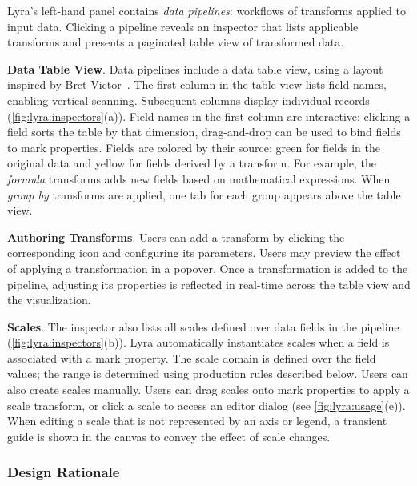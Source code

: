 \vspace{-7pt}

Lyra's left-hand panel contains \emph{data pipelines}: workflows of transforms
applied to input data. Clicking a pipeline reveals an inspector that lists
applicable transforms and presents a paginated table view of transformed data.

\textbf{Data Table View}. Data pipelines include a data table view, using a
layout inspired by Bret Victor~\cite{victor:drawing}. The first column in the
table view lists field names, enabling vertical scanning. Subsequent columns
display individual records (\cref{fig:lyra:inspectors}(a)). Field names in the
first column are interactive: clicking a field sorts the table by that
dimension, drag-and-drop can be used to bind fields to mark properties. Fields
are colored by their source: green for fields in the original data and yellow
for fields derived by a transform. For example, the \emph{formula} transforms
adds new fields based on mathematical expressions. When \emph{group by}
transforms are applied, one tab for each group appears above the table view.

\textbf{Authoring Transforms}. Users can add a transform by clicking the
corresponding icon and configuring its parameters. Users may preview the effect
of applying a transformation in a popover. Once a transformation is added to the
pipeline, adjusting its properties is reflected in real-time across the table
view and the visualization.

\textbf{Scales}. The inspector also lists all scales defined over data fields in
the pipeline (\cref{fig:lyra:inspectors}(b)). Lyra automatically instantiates
scales when a field is associated with a mark property. The scale domain is
defined over the field values; the range is determined using production rules
described below. Users can also create scales manually. Users can drag scales
onto mark properties to apply a scale transform, or click a scale to access an
editor dialog (see \cref{fig:lyra:usage}(e)). When editing a scale that is not
represented by an axis or legend, a transient guide is shown in the canvas to
convey the effect of scale changes.

\vspace{-10pt}

\subsubsection{Design Rationale}

\vspace{-10pt}

